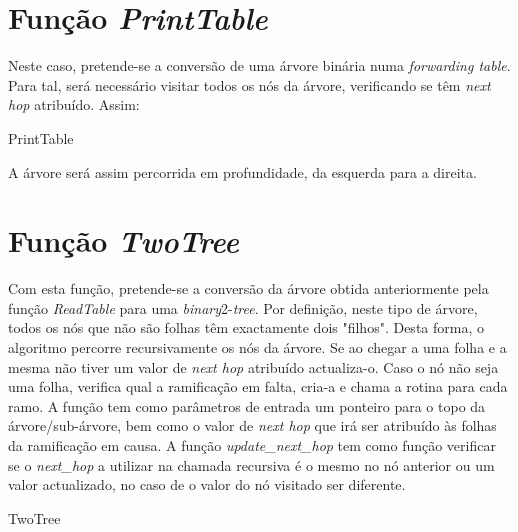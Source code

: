 \documentclass[a4paper]{article}
\begin{document}
\section{Função \textit{PrintTable}}
Neste caso, pretende-se a conversão de uma árvore binária numa \textit{forwarding table}. Para tal, será necessário visitar todos os nós da árvore, verificando se têm \textit{next hop} atribuído. Assim:

\begin{algorithm}[H]
 \Return\;
 \caption{PrintTable}
\end{algorithm}
A árvore será assim percorrida em profundidade, da esquerda para a direita.

\section{Função \textit{TwoTree}}
Com esta função, pretende-se a conversão da árvore obtida anteriormente pela função \textit{ReadTable} para uma \textit{binary}2-\textit{tree}. Por definição, neste tipo de árvore, todos os nós que não são folhas têm exactamente dois "filhos". Desta forma, o algoritmo percorre recursivamente os nós da árvore. Se ao chegar a uma folha e a mesma não tiver um valor de \textit{next hop} atribuído actualiza-o. Caso o nó não seja uma folha, verifica qual a ramificação em falta, cria-a e chama a rotina para cada ramo. A função tem como parâmetros de entrada um ponteiro para o topo da árvore/sub-árvore, bem como o valor de \textit{next hop} que irá ser atribuído às folhas da ramificação em  causa. A função \textit{update\_next\_hop} tem como função verificar se o \textit{next\_hop} a utilizar na chamada recursiva é o mesmo no nó anterior ou um valor actualizado, no caso de o valor do nó visitado ser diferente.

\begin{algorithm}[H]
 \Return\;
 \caption{TwoTree}
\end{algorithm}
\end{document}
